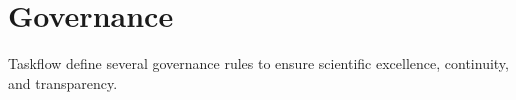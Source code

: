 \chapter{Governance}
\hypertarget{_governance}{}\label{_governance}
Taskflow define several governance rules to ensure scientific excellence, continuity, and transparency.


\begin{DoxyItemize}
\item {}
\item {}
\item {} 
\end{DoxyItemize}


